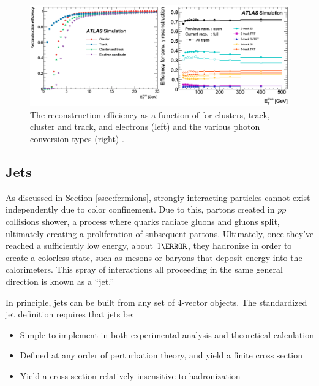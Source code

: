 \begin{figure}[h]
    \centering
    \includegraphics[width=1\textwidth]{chapters/chapter3_eventreco/images/combined-efficiency.png}

    \caption[The reconstruction efficiency as a function of \et for electrons and converted photons]{The reconstruction efficiency as a function of \et for clusters, track, cluster and track, and electrons (left) and the various photon conversion types (right) \cite{photon-electron-perf}.}
    \label{fig:reco-eff}
\end{figure}


\subsection{Jets} \label{ssec:jet-reco}
As discussed in Section \ref{ssec:fermions}, strongly interacting particles cannot exist independently due to color confinement. Due to this, partons created in $pp$ collisions shower, a process where quarks radiate gluons and gluons split, ultimately creating a proliferation of subsequent partons. Ultimately, once they've reached a sufficiently low energy, about $\unit{1}{\GeV}$, they hadronize in order to create a colorless state, such as mesons or baryons that deposit energy into the calorimeters. This spray of interactions all proceeding in the same general direction is known as a ``jet.''

In principle, jets can be built from any set of 4-vector objects. The standardized jet definition \cite{jet-standardization} requires that jets be:
\begin{itemize}
    \item Simple to implement in both experimental analysis and theoretical calculation
    \item Defined at any order of perturbation theory, and yield a finite cross section
    \item Yield a cross section relatively insensitive to hadronization
\end{itemize}

